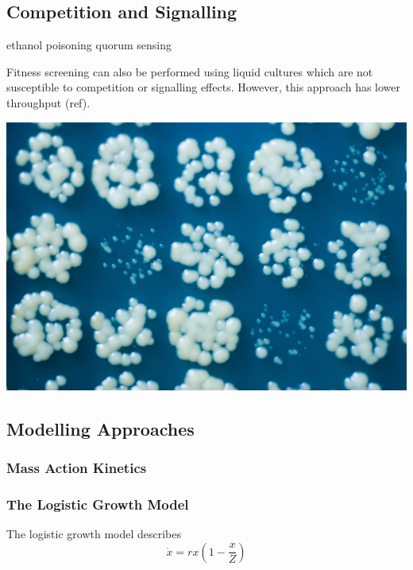 \begin{multicols}{2}


\subsection{Competition and Signalling}

ethanol poisoning
quorum sensing

Fitness screening can also be performed using liquid cultures which are not susceptible to
competition or signalling effects. However, this approach has lower throughput (ref).

\begin{Figure}
  \centering
  \includegraphics[width=\linewidth]{5658435523_c2e43729f1_b}
\end{Figure}

\subsection{Modelling Approaches}

\subsubsection{Mass Action Kinetics}
\subsubsection{The Logistic Growth Model}

The logistic growth model \cite{Verhulst1845} describes
\begin{equation}
  \label{eq:1}
  \dot{x} = rx\left(1 - \frac{x}{Z}\right)
\end{equation}

\end{multicols}
